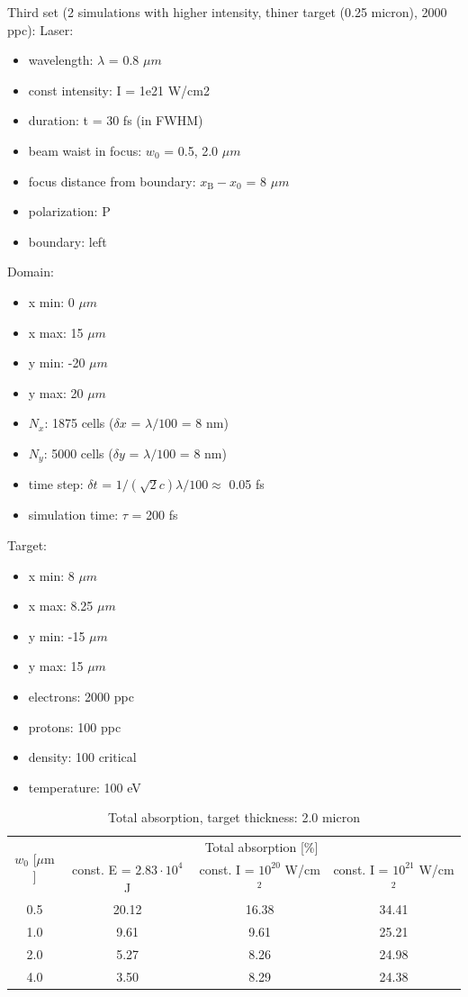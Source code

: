 \noindent
Third set (2 simulations with higher intensity, thiner target (0.25 micron), 2000 ppc):
\noindent
Laser:
\begin{itemize}
	\item wavelength: $ \lambda $ = 0.8 $ \mu m $
	\item const intensity: I = 1e21 W/cm2
	\item duration: t = 30 fs (in FWHM)
	\item beam waist in focus: $ w_0 $ = 0.5, 2.0 $ \mu m $
	\item focus distance from boundary: $ x_\mathrm{B} - x_0 $ = 8 $ \mu m $
	\item polarization: P
	\item boundary: left 
\end{itemize}
Domain:
\begin{itemize}
	\item x min: 0 $ \mu m $
	\item x max: 15 $ \mu m $
	\item y min: -20 $ \mu m $
	\item y max: 20 $ \mu m $
	\item $ N_x $: 1875 cells ($ \delta x $ = $ \lambda/100 $ = 8 nm)
	\item $ N_y $: 5000 cells ($ \delta y $ = $ \lambda/100 $ = 8 nm)
	\item time step: $ \delta t $ = $ 1/(\sqrt{2} c) \lambda /100 \approx $ 0.05 fs 
	\item simulation time: $ \tau $ = 200 fs
\end{itemize}
Target:
\begin{itemize}
	\item x min: 8 $ \mu m $
	\item x max: 8.25 $ \mu m $
	\item y min: -15 $ \mu m $
	\item y max: 15 $ \mu m $
	\item electrons: 2000 ppc
	\item protons: 100 ppc
	\item density: 100 critical
	\item temperature: 100 eV
\end{itemize}

\begingroup
\renewcommand*{\arraystretch}{1.5}
\begin{table}[h!]
	\centering
	\begin{tabular}{c | c | c | c}
		\multirow{2}{*}{$ w_0 $ [$ \mu\mathrm{m} $]} & \multicolumn{3}{c}{Total absorption [\%]} \\ \cline{2-4}
		 & const. E = $ 2.83 \cdot 10^{4} $ J & const. I = $ 10^{20} $ W/cm$^2$ & const. I = $ 10^{21} $ W/cm$^2$ \\ \hline \hline
		0.5 & 20.12 & 16.38 & 34.41 \\ \hline
		1.0 & 9.61 & 9.61 & 25.21 \\ \hline
		2.0 & 5.27 & 8.26 & 24.98 \\ \hline
		4.0 & 3.50 & 8.29 & 24.38 \\
	\end{tabular}
	\caption{Total absorption, target thickness: 2.0 micron}
	\label{table:4}
\end{table}
\endgroup

